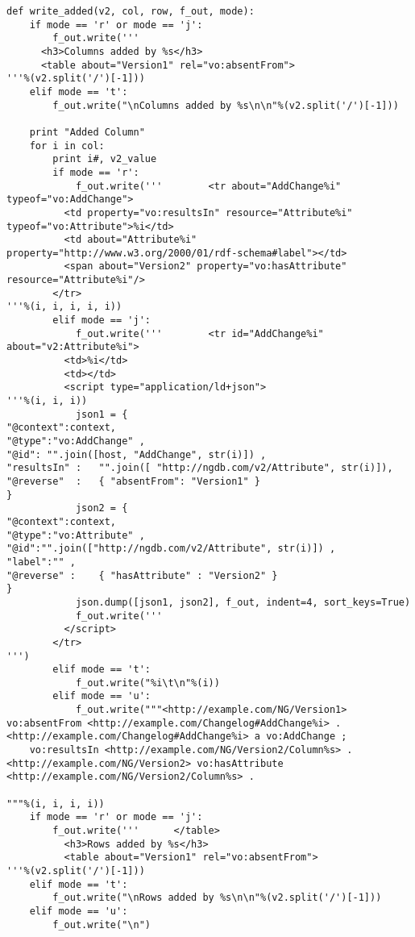 \begin{verbatim}
def write_added(v2, col, row, f_out, mode):
	if mode == 'r' or mode == 'j':
		f_out.write('''
      <h3>Columns added by %s</h3>
      <table about="Version1" rel="vo:absentFrom">
'''%(v2.split('/')[-1]))
	elif mode == 't':
		f_out.write("\nColumns added by %s\n\n"%(v2.split('/')[-1]))
	
	print "Added Column"
	for i in col:
		print i#, v2_value
		if mode == 'r':
			f_out.write('''        <tr about="AddChange%i" typeof="vo:AddChange">
          <td property="vo:resultsIn" resource="Attribute%i" typeof="vo:Attribute">%i</td>
          <td about="Attribute%i" property="http://www.w3.org/2000/01/rdf-schema#label"></td>
          <span about="Version2" property="vo:hasAttribute" resource="Attribute%i"/>
        </tr>
'''%(i, i, i, i, i))
		elif mode == 'j':
			f_out.write('''        <tr id="AddChange%i" about="v2:Attribute%i">
          <td>%i</td>
          <td></td>
          <script type="application/ld+json">
'''%(i, i, i))
			json1 = {
"@context":context,
"@type":"vo:AddChange" ,
"@id": "".join([host, "AddChange", str(i)]) ,
"resultsIn" :   "".join([ "http://ngdb.com/v2/Attribute", str(i)]),
"@reverse"  :   { "absentFrom": "Version1" }
}
			json2 = {
"@context":context,
"@type":"vo:Attribute" ,
"@id":"".join(["http://ngdb.com/v2/Attribute", str(i)]) ,
"label":"" ,
"@reverse" :    { "hasAttribute" : "Version2" }
}
			json.dump([json1, json2], f_out, indent=4, sort_keys=True)
			f_out.write('''
          </script>
        </tr>
''')
		elif mode == 't':
			f_out.write("%i\t\n"%(i))	
		elif mode == 'u':
			f_out.write("""<http://example.com/NG/Version1> vo:absentFrom <http://example.com/Changelog#AddChange%i> .
<http://example.com/Changelog#AddChange%i> a vo:AddChange ;
	vo:resultsIn <http://example.com/NG/Version2/Column%s> .
<http://example.com/NG/Version2> vo:hasAttribute <http://example.com/NG/Version2/Column%s> .

"""%(i, i, i, i))
	if mode == 'r' or mode == 'j':
		f_out.write('''      </table>
	      <h3>Rows added by %s</h3>
	      <table about="Version1" rel="vo:absentFrom">
'''%(v2.split('/')[-1]))
	elif mode == 't':
		f_out.write("\nRows added by %s\n\n"%(v2.split('/')[-1]))
	elif mode == 'u':
		f_out.write("\n")
	

\end{verbatim}
